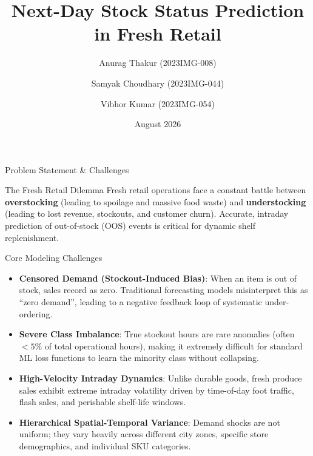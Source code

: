 \documentclass[10pt, aspectratio=169]{beamer}
\title[Next-Day Stock Status Prediction]{Next-Day Stock Status Prediction in Fresh Retail}
\author[Anurag, Samyak, Vibhor]{
  Anurag Thakur \small(2023IMG-008) \and
  Samyak Choudhary \small(2023IMG-044) \and
  Vibhor Kumar \small(2023IMG-054)
}
\institute[BTP 2026]{\large Department of Information Technology\\[0.1cm] Bachelor of Technology Project (BTP)}
\date{August 2026}
\begin{document}
\begin{frame}
  \titlepage
\end{frame}

\begin{frame}{Problem Statement \& Challenges}
  \begin{block}{The Fresh Retail Dilemma}
    Fresh retail operations face a constant battle between \textbf{overstocking} (leading to spoilage and massive food waste) and \textbf{understocking} (leading to lost revenue, stockouts, and customer churn). Accurate, intraday prediction of out-of-stock (OOS) events is critical for dynamic shelf replenishment.
  \end{block}

  \vspace{0.3cm}

  \begin{exampleblock}{Core Modeling Challenges}
    \small
    \begin{itemize}
      \item \textbf{Censored Demand (Stockout-Induced Bias)}: When an item is out of stock, sales record as zero. Traditional forecasting models misinterpret this as ``zero demand'', leading to a negative feedback loop of systematic under-ordering.
      \item \textbf{Severe Class Imbalance}: True stockout hours are rare anomalies (often $<5\%$ of total operational hours), making it extremely difficult for standard ML loss functions to learn the minority class without collapsing.
      \item \textbf{High-Velocity Intraday Dynamics}: Unlike durable goods, fresh produce sales exhibit extreme intraday volatility driven by time-of-day foot traffic, flash sales, and perishable shelf-life windows.
      \item \textbf{Hierarchical Spatial-Temporal Variance}: Demand shocks are not uniform; they vary heavily across different city zones, specific store demographics, and individual SKU categories.
    \end{itemize}
  \end{exampleblock}
\end{frame}
\end{document}
